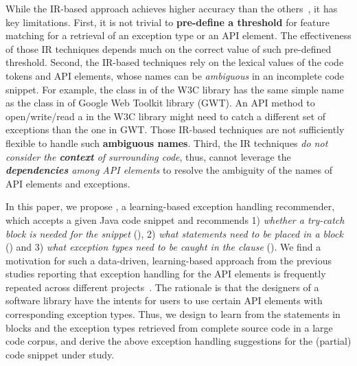 While the IR-based approach achieves higher accuracy than the
others~\cite{xrank-fse20}, it has key limitations. First, it is
not trivial to {\bf pre-define a threshold} for feature matching for a
retrieval of an exception type or an API element. The effectiveness of
those IR techniques depends much on the correct value of such
pre-defined threshold. Second, the IR-based techniques rely on the
lexical values of the code tokens and API elements, whose names can be
{\em ambiguous} in an incomplete code snippet. For example, the
 class in  of the W3C library has
the same simple name as the  class in
 of Google Web
Toolkit library (GWT). An API method to open/write/read a
 in the W3C library might need to catch a different set
of exceptions than the one in GWT. Those IR-based
techniques are not sufficiently flexible to handle such {\bf ambiguous
  names}. Third, the IR techniques {\em do not consider the {\bf
    context} of surrounding code}, thus, cannot leverage the {\em {\bf
    dependencies} among API elements} to resolve the ambiguity of the
names of API elements and exceptions.

In this paper, we propose {\tool}, a learning-based exception handling
recommender, which accepts a given Java code snippet and recommends 1) {\em
  whether a try-catch block is needed for the snippet} ({\xblock}), 2)
{\em what statements need to be placed in a  block}
({\xstate}) and 3) {\em what exception types need to be caught in the
   clause} ({\xtype}).  We find a motivation for such a
data-driven, learning-based approach from the previous studies
reporting that exception handling for the API elements is frequently
repeated across different
projects~\cite{chanchal-scam14,zhong-jss18}. The rationale is that the
designers of a software library have the intents for users to use
certain API elements with corresponding exception types.
Thus, we design {\tool} to learn from the statements in
 blocks and the exception types retrieved from complete
source code in a large code corpus, and derive the above exception handling
suggestions
for the (partial) code snippet under study.


